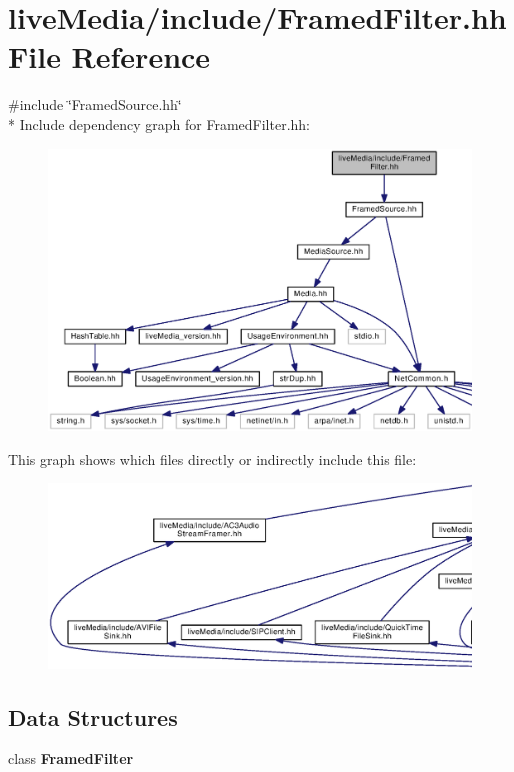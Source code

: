 \section{live\+Media/include/\+Framed\+Filter.hh File Reference}
\label{FramedFilter_8hh}
{\ttfamily \#include \char`\"{}Framed\+Source.\+hh\char`\"{}}\\*
Include dependency graph for Framed\+Filter.\+hh\+:
\nopagebreak
\begin{figure}[H]
\begin{center}
\leavevmode
\includegraphics[width=350pt]{FramedFilter_8hh__incl}
\end{center}
\end{figure}
This graph shows which files directly or indirectly include this file\+:
\nopagebreak
\begin{figure}[H]
\begin{center}
\leavevmode
\includegraphics[width=350pt]{FramedFilter_8hh__dep__incl}
\end{center}
\end{figure}
\subsection*{Data Structures}
\begin{DoxyCompactItemize}
\item 
class {\bf Framed\+Filter}
\end{DoxyCompactItemize}
